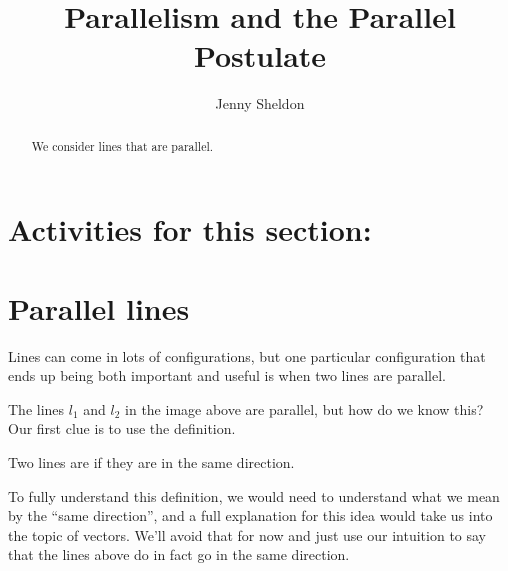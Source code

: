 \documentclass{ximera}
\title{Parallelism and the Parallel Postulate}
\author{Jenny Sheldon}
\begin{document}
\begin{abstract}
We consider lines that are parallel.
\end{abstract}
\maketitle


\section{Activities for this section:} 

\section{Parallel lines}

Lines can come in lots of configurations, but one particular configuration that ends up being both important and useful is when two lines are parallel.
\begin{image}
\end{image}


The lines $l_1$ and $l_2$ in the image above are parallel, but how do we know this? Our first clue is to use the definition.
\begin{definition}
	Two lines are  if they are in the same direction.
\end{definition}

To fully understand this definition, we would need to understand what we mean by the ``same direction'', and a full explanation for this idea would take us into the topic of vectors. We'll avoid that for now and just use our intuition to say that the lines above do in fact go in the same direction.
\end{document}
